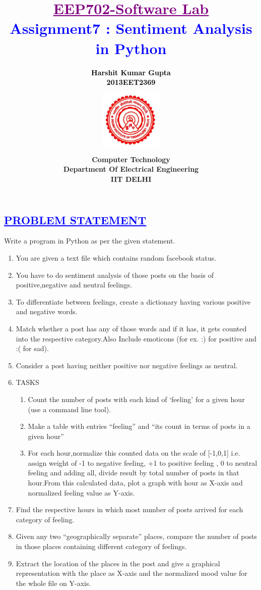 \documentclass[a4paper,12pt]{report}
\title{\bfseries\huge \textcolor{purple}{\underline {EEP702-Software Lab}} \\{\textcolor{blue}{Assignment7 : Sentiment Analysis in Python}}}
\author{\bfseries\large\textcolor{black}  {Harshit Kumar Gupta}\\ {\textcolor{black} {2013EET2369 }}\\
\includegraphics[width=3cm,height=3.4cm]{./iit.png}\\\noindent Computer Technology\\
\noindent Department Of Electrical Engineering\\IIT DELHI}
\begin{document}
\maketitle
\tableofcontents

\begin{center}
 \chapter{\textcolor{blue}{\underline {PROBLEM STATEMENT}}}
\noindent Write a program in Python as per the given statement.

\begin{enumerate}
 \item You are given a text file which contains random facebook status.
 \item You have to do sentiment analysis of those posts on the basis of
       positive,negative and neutral feelings.
 \item To differentiate between feelings, create a dictionary having various positive and
negative words.
\item Match whether a post has any of those words and if it has, it gets counted into the
respective category.Also Include emoticons (for ex. :) for positive and :( for sad).
\item Consider a post having neither positive nor negative feelings as neutral.
\item TASKS
\begin{enumerate}
 \item Count the number of posts with each kind of ‘feeling’ for a given hour (use
a command line tool).
\item Make a table with entries “feeling” and “its count in terms of posts in a
given hour”
\item For each hour,normalize this counted data on the scale of [-1,0,1] i.e.
assign weight of -1 to negative feeling, +1 to positive feeling , 0 to neutral
feeling and adding all, divide result by total number of posts in that
hour.From this calculated data, plot a graph with hour as X-axis and
normalized feeling value as Y-axis.
\end{enumerate}
\item Find the respective hours in which most number of posts arrived for each category of
feeling.
\item Given any two “geographically separate” places, compare the number of posts in those
places containing different category of feelings.
\item Extract the location of the places in the post and give a graphical representation with the
place as X-axis and the normalized mood value for the whole file on Y-axis.


\end{enumerate}

\end{center}
\end{document}
